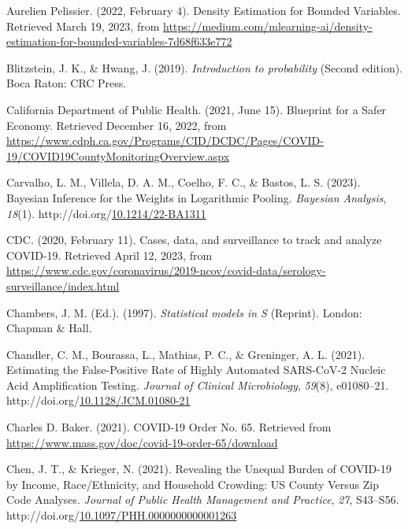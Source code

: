\documentclass[12pt,twoside]{smiththesis}
\newlength{\cslhangindent}
\newenvironment{CSLReferences}[2] %
 {%
\setlength{\parindent}{0pt}
\ifodd #1 \everypar{\setlength{\hangindent}{\cslhangindent}}\ignorespaces\fi
\ifnum #2 > 0
\setlength{\parskip}{#2\baselineskip}
  \fi
}%
{}
\begin{document}
\hypertarget{refs}{}
\begin{CSLReferences}{1}{0}
\leavevmode{}%
Aurelien Pelissier. (2022, February 4). Density {Estimation} for {Bounded Variables}. Retrieved March 19, 2023, from \url{https://medium.com/mlearning-ai/density-estimation-for-bounded-variables-7d68f633e772}

\leavevmode{}%
Blitzstein, J. K., \& Hwang, J. (2019). \emph{Introduction to probability} (Second edition). {Boca Raton}: {CRC Press}.

\leavevmode{}%
California Department of Public Health. (2021, June 15). Blueprint for a {Safer Economy}. Retrieved December 16, 2022, from \url{https://www.cdph.ca.gov/Programs/CID/DCDC/Pages/COVID-19/COVID19CountyMonitoringOverview.aspx}

\leavevmode{}%
Carvalho, L. M., Villela, D. A. M., Coelho, F. C., \& Bastos, L. S. (2023). Bayesian {Inference} for the {Weights} in {Logarithmic Pooling}. \emph{Bayesian Analysis}, \emph{18}(1). http://doi.org/\href{https://doi.org/10.1214/22-BA1311}{10.1214/22-BA1311}

\leavevmode{}%
CDC. (2020, February 11). Cases, data, and surveillance to track and analyze {COVID-19}. Retrieved April 12, 2023, from \url{https://www.cdc.gov/coronavirus/2019-ncov/covid-data/serology-surveillance/index.html}

\leavevmode{}%
Chambers, J. M. (Ed.). (1997). \emph{Statistical models in {S}} (Reprint). {London}: {Chapman \& Hall}.

\leavevmode{}%
Chandler, C. M., Bourassa, L., Mathias, P. C., \& Greninger, A. L. (2021). Estimating the {False-Positive Rate} of {Highly Automated SARS-CoV-2 Nucleic Acid Amplification Testing}. \emph{Journal of Clinical Microbiology}, \emph{59}(8), e01080--21. http://doi.org/\href{https://doi.org/10.1128/JCM.01080-21}{10.1128/JCM.01080-21}

\leavevmode{}%
Charles D. Baker. (2021). {COVID-19 Order No}. 65. Retrieved from \url{https://www.mass.gov/doc/covid-19-order-65/download}

\leavevmode{}%
Chen, J. T., \& Krieger, N. (2021). Revealing the {Unequal Burden} of {COVID-19} by {Income}, {Race}/{Ethnicity}, and {Household Crowding}: {US County Versus Zip Code Analyses}. \emph{Journal of Public Health Management and Practice}, \emph{27}, S43--S56. http://doi.org/\href{https://doi.org/10.1097/PHH.0000000000001263}{10.1097/PHH.0000000000001263}


\end{CSLReferences}
\end{document}
